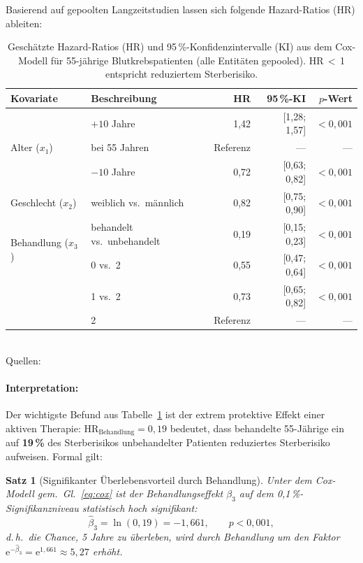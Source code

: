 ﻿\documentclass[12pt,a4paper]{article}
\newtheorem{theorem}{Satz}[section]
\theoremstyle{definition}
\begin{document}
Basierend auf gepoolten Langzeitstudien \cite{dohner2017,hochhaus2017,coiffier2002}
lassen sich folgende Hazard-Ratios (HR) ableiten:

\begin{table}[ht]
\centering
\caption{Geschätzte Hazard-Ratios (HR) und 95\,\%-Konfidenzintervalle (KI) aus dem
Cox-Modell für 55-jährige Blutkrebspatienten (alle Entitäten gepooled).
HR\,$<$\,1 entspricht reduziertem Sterberisiko.}
\label{tab:cox}
\begin{tabular}{@{}llrrr@{}}
\toprule
Kovariate & Beschreibung & HR & 95\,\%-KI & $p$-Wert \\
\midrule
\multirow{3}{*}{Alter ($x_1$)} & $+10$ Jahre & 1{,}42 & [1{,}28; 1{,}57] & $<0{,}001$ \\
& bei 55 Jahren & Referenz & --- & --- \\
& $-10$ Jahre & 0{,}72 & [0{,}63; 0{,}82] & $<0{,}001$ \\
\midrule
Geschlecht ($x_2$) & weiblich vs.\ männlich & 0{,}82 & [0{,}75; 0{,}90] & $<0{,}001$ \\
\midrule
\multirow{2}{*}{Behandlung ($x_3$)} & behandelt vs.\ unbehandelt & 0{,}19 & [0{,}15; 0{,}23] & $<0{,}001$ \\
\midrule
\multirow{3}{*}{ECOG ($x_4$)} & 0 vs.\ 2 & 0{,}55 & [0{,}47; 0{,}64] & $<0{,}001$ \\
& 1 vs.\ 2 & 0{,}73 & [0{,}65; 0{,}82] & $<0{,}001$ \\
& 2 & Referenz & --- & --- \\
\bottomrule
\end{tabular}
\smallskip\\
\footnotesize Quellen: \cite{dohner2017,hochhaus2017,coiffier2002,appelbaum2006,extermann2007}
\end{table}

\paragraph{Interpretation:} Der wichtigste Befund aus Tabelle~\ref{tab:cox} ist der
extrem protektive Effekt einer aktiven Therapie:
$\mathrm{HR}_{\text{Behandlung}} = 0{,}19$ bedeutet, dass behandelte 55-Jährige
ein auf \textbf{19\,\%} des Sterberisikos unbehandelter Patienten reduziertes
Sterberisiko aufweisen. Formal gilt:

\begin{theorem}[Signifikanter Überlebensvorteil durch Behandlung]
  \label{thm:treatment_benefit}
  Unter dem Cox-Modell gem.\ Gl.~\eqref{eq:cox} ist der Behandlungseffekt
  $\beta_3$ auf dem 0{,}1\,\%-Signifikanzniveau statistisch hoch signifikant:
  \begin{equation}
    \hat{\beta}_3 = \ln(0{,}19) = -1{,}661,
    \qquad
    p < 0{,}001,
    \label{eq:beta_treatment}
  \end{equation}
  d.\,h.\ die Chance, 5 Jahre zu überleben, wird durch Behandlung um den Faktor
  $\mathrm{e}^{-\hat{\beta}_3} = \mathrm{e}^{1{,}661} \approx 5{,}27$ erhöht.
\end{theorem}
\end{document}
